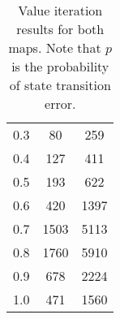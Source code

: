 \begin{table}[!htb]
\begin{minipage}{0.5\textwidth}
\begin{tabular}{@{}c|cc@{}}
        0.3          & 80                  & 259                      \\
        0.4          & 127                 & 411                      \\
        0.5          & 193                 & 622                      \\
        0.6          & 420                 & 1397                     \\
        0.7          & 1503                & 5113                     \\
        0.8          & 1760                & 5910                     \\
        0.9          & 678                 & 2224                     \\
        1.0          & 471                 & 1560                     \\ \bottomrule
        \end{tabular}
    \end{minipage}
    \caption{Value iteration results for both maps. Note that $p$ is the probability of state transition error.}\label{table:valueitertable}
\end{table}